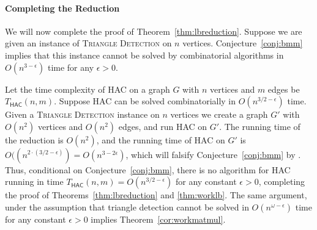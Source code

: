 \paragraph{Completing the Reduction}
We will now complete the proof of Theorem~\ref{thm:lbreduction}.
Suppose we are given an instance of \textsc{Triangle Detection} on $n$ vertices.
Conjecture~\ref{conj:bmm} implies that this instance cannot be solved by combinatorial algorithms in $O(n^{3-\epsilon})$ time for any $\epsilon > 0$.

Let the time complexity of HAC on a graph $G$ with $n$ vertices and $m$ edges be $T_{\mathsf{HAC}}(n,m)$.
Suppose HAC can be solved combinatorially in $O(n^{3/2 - \epsilon})$ time.
Given a \textsc{Triangle Detection} instance on $n$ vertices we create a graph $G'$ with $O(n^2)$ vertices and $O(n^2)$ edges, and run HAC on $G'$.
The running time of the reduction is $O(n^2)$, and the running time of HAC on $G'$ is $O((n^{2\cdot (3/2-\epsilon)}) = O(n^{3 - 2\epsilon})$, which will falsify Conjecture~\ref{conj:bmm} by .
Thus, conditional on Conjecture~\ref{conj:bmm}, there is no algorithm for HAC running in time $T_{\mathsf{HAC}}(n, m) = O(n^{3/2 - \epsilon})$ for any constant $\epsilon > 0$, completing the proof of Theorems~\ref{thm:lbreduction} and \ref{thm:worklb}. 
The same argument, under the assumption that triangle detection cannot be solved in $O(n^{\omega - \epsilon})$ time for any constant $\epsilon > 0$ implies Theorem~\ref{cor:workmatmul}.




